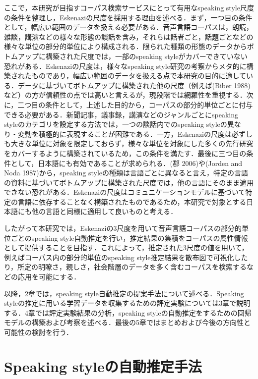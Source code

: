 \documentclass[japanese]{jnlp_1.4}
\begin{document}
ここで，本研究が目指すコーパス検索サービスにとって有用なspeaking style尺度の条件を整理し，Eskenaziの尺度を採用する理由を述べる．まず，一つ目の条件として，幅広い範囲のデータを扱える必要がある．音声言語コーパスは，朗読，雑談，講演などの様々な形態の談話を含み，それらは話者ごと，話題ごとなどの様々な単位の部分的単位により構成される．限られた種類の形態のデータからボトムアップに構築された尺度では，一部のspeaking styleがカバーできていない恐れがある．Eskenaziの尺度は，様々なspeaking style研究の考察からメタ的に構築されたものであり，幅広い範囲のデータを扱える点で本研究の目的に適している．データに基づいてボトムアップに構築された他の尺度（例えば(Biber 1988)など）の方が信頼性の点では高いと言えるが，現段階では網羅性を重視する．次に，二つ目の条件として，上述した目的から，コーパスの部分的単位ごとに付与できる必要がある．新聞記事，議事録，講演などのジャンルごとにspeaking styleのカテゴリを設定する方法では，一つの談話内でのspeaking styleの異なり・変動を積極的に表現することが困難である．一方，Eskenaziの尺度は必ずしも大きな単位に対象を限定しておらず，様々な単位を対象にした多くの先行研究をカバーするように構築されているため，この条件を満たす．最後に三つ目の条件として，日本語にも有効であることが求められる．(郡 2006)や(Jorden and Noda 1987)から，speaking styleの種類は言語ごとに異なると言え，特定の言語の資料に基づいてボトムアップに構築された尺度では，他の言語にそのまま適用できない恐れがある．Eskenaziの尺度はコミュニケーションモデルに基づいて特定の言語に依存することなく構築されたものであるため，本研究で対象とする日本語にも他の言語と同様に適用して良いものと考える．

したがって本研究では，Eskenaziの3尺度を用いて音声言語コーパスの部分的単位ごとのspeaking style自動推定を行い，推定結果の集積をコーパスの属性情報として提供することを目指す．これによって，推定された3尺度の値を用いて，例えばコーパス内の部分的単位のspeaking style推定結果を散布図で可視化したり，所定の明瞭さ，親しさ，社会階層のデータを多く含むコーパスを検索するなどの応用を可能にする．

以降，2章では，speaking style自動推定の提案手法について述べる．Speaking styleの推定に用いる学習データを収集するための評定実験については3章で説明する．4章では評定実験結果の分析，speaking styleの自動推定をするための回帰モデルの構築および考察を述べる．最後の5章ではまとめおよび今後の方向性と可能性の検討を行う．


\section{Speaking styleの自動推定手法}
\end{document}
